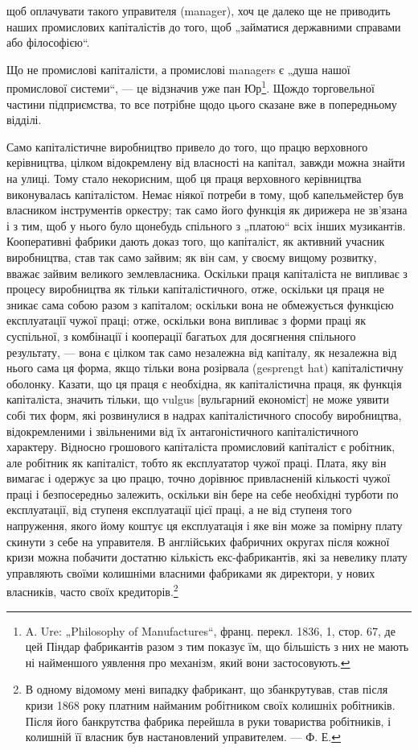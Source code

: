 щоб оплачувати такого управителя (manager), хоч це далеко
ще не приводить наших промислових капіталістів до того, щоб
„займатися державними справами або філософією“.

Що не промислові капіталісти, а промислові managers є „душа
нашої промислової системи“, — це відзначив уже пан Юр\footnote{
A. Ure: „Philosophy of Manufactures“, франц. перекл. 1836, 1, стор. 67,
де цей Піндар фабрикантів разом з тим показує їм, що більшість з них не
мають ні найменшого уявлення про механізм, який вони застосовують.
}.
Щождо торговельної частини підприємства, то все потрібне
щодо цього сказане вже в попередньому відділі.

Само капіталістичне виробництво привело до того, що працю
верховного керівництва, цілком відокремлену від власності на капітал,
завжди можна знайти на улиці. Тому стало некорисним, щоб ця
праця верховного керівництва виконувалась капіталістом. Немає
ніякої потреби в тому, щоб капельмейстер був власником інструментів
оркестру; так само його функція як дирижера не зв’язана і з тим,
щоб у нього було щонебудь спільного з „платою“ всіх інших музикантів.
Кооперативні фабрики дають доказ того, що капіталіст, як
активний учасник виробництва, став так само зайвим; як він сам,
у своєму вищому розвитку, вважає зайвим великого землевласника.
Оскільки праця капіталіста не випливає з процесу виробництва
як тільки капіталістичного, отже, оскільки ця праця не
зникає сама собою разом з капіталом; оскільки вона не обмежується
функцією експлуатації чужої праці; отже, оскільки вона
випливає з форми праці як суспільної, з комбінації і кооперації
багатьох для досягнення спільного результату, — вона є цілком так
само незалежна від капіталу, як незалежна від нього сама ця форма,
якщо тільки вона розірвала (gesprengt hat) капіталістичну оболонку.
Казати, що ця праця є необхідна, як капіталістична праця,
як функція капіталіста, значить тільки, що vulgus [вульгарний
економіст] не може уявити собі тих форм, які розвинулися
в надрах капіталістичного способу виробництва, відокремленими
і звільненими від їх антагоністичного капіталістичного характеру.
Відносно грошового капіталіста промисловий капіталіст
є робітник, але робітник як капіталіст, тобто як експлуататор
чужої праці. Плата, яку він вимагає і одержує за цю працю,
точно дорівнює привласненій кількості чужої праці і безпосередньо
залежить, оскільки він бере на себе необхідні турботи по
експлуатації, від ступеня експлуатації цієї праці, а не від ступеня
того напруження, якого йому коштує ця експлуатація і яке він може
за помірну плату скинути з себе на управителя. В англійських
фабричних округах після кожної кризи можна побачити достатню
кількість екс-фабрикантів, які за невелику плату управляють
своїми колишніми власними фабриками як директори, у нових власників,
часто своїх кредиторів.\footnote{
В одному відомому мені випадку фабрикант, що збанкрутував, став після
кризи 1868 року платним найманим робітником своїх колишніх робітників. Після
його банкрутства фабрика перейшла в руки товариства робітників, і колишній
її власник був настановлений управителем. — Ф. Е.
}